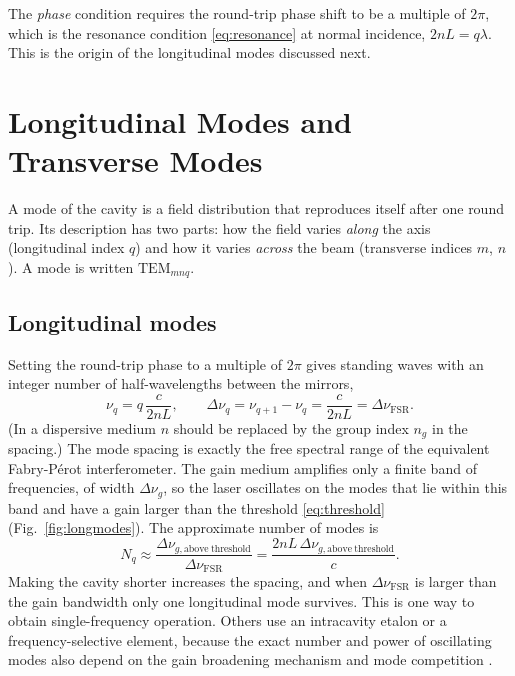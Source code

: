 \documentclass[11pt,a4paper]{article}
\newcommand{\FP}{Fabry-P\'erot}
\newcommand{\FSR}{\Delta\nu_{\mathrm{FSR}}}
\begin{document}
	The \emph{phase} condition requires the round-trip phase shift to be a multiple of $2\pi$, which is the resonance condition \eqref{eq:resonance} at normal incidence, $2nL=q\lambda$. This is the origin of the longitudinal modes discussed next.
	
	\section{Longitudinal Modes and Transverse Modes}
	
	A mode of the cavity is a field distribution that reproduces itself after one round trip. Its description has two parts: how the field varies \emph{along} the axis (longitudinal index $q$) and how it varies \emph{across} the beam (transverse indices $m$, $n$). A mode is written $\mathrm{TEM}_{mnq}$.
	
	\subsection{Longitudinal modes}
	
	Setting the round-trip phase to a multiple of $2\pi$ gives standing waves with an integer number of half-wavelengths between the mirrors,
	\begin{equation}
		\nu_q = q\,\frac{c}{2nL}, \qquad \Delta\nu_q=\nu_{q+1}-\nu_q=\frac{c}{2nL}=\FSR .
		\label{eq:longmodes}
	\end{equation}
	(In a dispersive medium $n$ should be replaced by the group index $n_g$ in the spacing.) The mode spacing is exactly the free spectral range of the equivalent \FP{} interferometer. The gain medium amplifies only a finite band of frequencies, of width $\Delta\nu_g$, so the laser oscillates on the modes that lie within this band and have a gain larger than the threshold \eqref{eq:threshold} (Fig.~\ref{fig:longmodes}). The approximate number of modes is
	\begin{equation}
		N_q \approx \frac{\Delta\nu_{g,\mathrm{above\ threshold}}}{\FSR} = \frac{2nL\,\Delta\nu_{g,\mathrm{above\ threshold}}}{c}.
	\end{equation}
	Making the cavity shorter increases the spacing, and when $\FSR$ is larger than the gain bandwidth only one longitudinal mode survives. This is one way to obtain single-frequency operation. Others use an intracavity etalon or a frequency-selective element, because the exact number and power of oscillating modes also depend on the gain broadening mechanism and mode competition \cite{Siegman,Svelto}.
	
\end{document}
